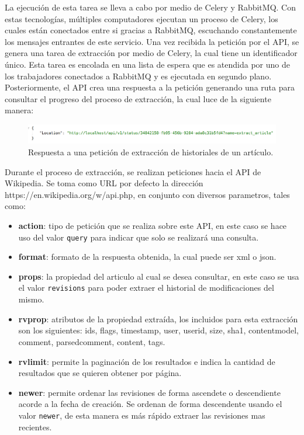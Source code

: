 La ejecución de esta tarea se lleva a cabo por medio de Celery y RabbitMQ.
Con estas tecnologías, múltiples computadores ejecutan un proceso de Celery, los
cuales están conectados entre si gracias a RabbitMQ, escuchando constantemente los mensajes entrantes de este servicio.
Una vez recibida la petición por el API, se genera una tarea de extracción por medio de Celery, la cual tiene un identificador único. Esta tarea es encolada en una lista de
espera que es atendida por uno de los trabajadores conectados a RabbitMQ y es ejecutada en segundo plano.
Posteriormente, el API crea una respuesta a la petición generando una ruta para consultar el progreso
del proceso de extracción, la cual luce de la siguiente manera:

\begin{figure}[H]
	\centering
		\includegraphics[width=1\textwidth]{figures/extract_response}
	\caption{Respuesta a una petición de extracción de historiales de un artículo.}
	\label{fig:extract_response}
\end{figure}

Durante el proceso de extracción, se realizan peticiones hacia el API de Wikipedia.
Se toma como URL por defecto la dirección https://en.wikipedia.org/w/api.php, en conjunto con diversos parametros, tales como:

\begin{itemize}
	\item \textbf{action}: tipo de petición que se realiza sobre este API, en este caso se hace uso del valor \texttt{query} para indicar que solo se realizará una consulta.

	\item \textbf{format}: formato de la respuesta obtenida, la cual puede ser xml o json.

	\item \textbf{props}: la propiedad del articulo al cual se desea consultar, en este caso se usa el valor \texttt{revisions} para poder extraer el historial de modificaciones del mismo.

	\item \textbf{rvprop}: atributos de la propiedad extraída, los incluidos para esta extracción son los siguientes: ids, flags, timestamp, user, userid, size, sha1, contentmodel, comment, parsedcomment, content, tags.

	\item \textbf{rvlimit}: permite la paginación de los resultados e indica la cantidad de resultados que se quieren obtener por página.

	\item \textbf{newer}: permite ordenar las revisiones de forma ascendete o descendiente acorde a la fecha de creación. Se ordenan de forma descendente usando el valor \texttt{newer}, de esta manera es más rápido extraer las revisiones mas recientes.
\end{itemize}

